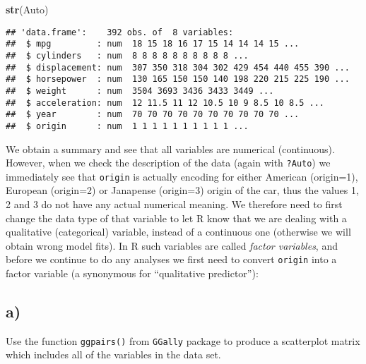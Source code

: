 \documentclass[]{article}
\newenvironment{Shaded}{\begin{snugshade}}{\end{snugshade}}
\newcommand{\KeywordTok}[1]{\textcolor[rgb]{0.13,0.29,0.53}{\textbf{#1}}}
\newcommand{\NormalTok}[1]{#1}
\newcommand{\OperatorTok}[1]{\textcolor[rgb]{0.81,0.36,0.00}{\textbf{#1}}}
\newcommand{\StringTok}[1]{\textcolor[rgb]{0.31,0.60,0.02}{#1}}
\begin{document}
\begin{Shaded}
\begin{Highlighting}[]
\KeywordTok{str}\NormalTok{(Auto)}
\end{Highlighting}
\end{Shaded}

\begin{verbatim}
## 'data.frame':    392 obs. of  8 variables:
##  $ mpg         : num  18 15 18 16 17 15 14 14 14 15 ...
##  $ cylinders   : num  8 8 8 8 8 8 8 8 8 8 ...
##  $ displacement: num  307 350 318 304 302 429 454 440 455 390 ...
##  $ horsepower  : num  130 165 150 150 140 198 220 215 225 190 ...
##  $ weight      : num  3504 3693 3436 3433 3449 ...
##  $ acceleration: num  12 11.5 11 12 10.5 10 9 8.5 10 8.5 ...
##  $ year        : num  70 70 70 70 70 70 70 70 70 70 ...
##  $ origin      : num  1 1 1 1 1 1 1 1 1 1 ...
\end{verbatim}

We obtain a summary and see that all variables are numerical
(continuous). However, when we check the description of the data (again
with \texttt{?Auto}) we immediately see that \texttt{origin} is actually
encoding for either American (origin=1), European (origin=2) or
Janapense (origin=3) origin of the car, thus the values 1, 2 and 3 do
not have any actual numerical meaning. We therefore need to first change
the data type of that variable to let R know that we are dealing with a
qualitative (categorical) variable, instead of a continuous one
(otherwise we will obtain wrong model fits). In R such variables are
called \emph{factor variables}, and before we continue to do any
analyses we first need to convert \texttt{origin} into a factor variable
(a synonymous for ``qualitative predictor''):

\begin{Shaded}
\end{Shaded}

\hypertarget{a}{%
\subsection{a)}\label{a}}

Use the function \texttt{ggpairs()} from \texttt{GGally} package to
produce a scatterplot matrix which includes all of the variables in the
data set.
\end{document}
